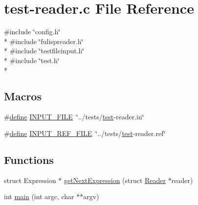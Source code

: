 \hypertarget{test-reader_8c}{\section{test-\/reader.c File Reference}
\label{test-reader_8c}
}
{\ttfamily \#include \char`\"{}config.\+h\char`\"{}}\\*
{\ttfamily \#include \char`\"{}fulispreader.\+h\char`\"{}}\\*
{\ttfamily \#include \char`\"{}testfileinput.\+h\char`\"{}}\\*
{\ttfamily \#include \char`\"{}test.\+h\char`\"{}}\\*
\subsection*{Macros}
\begin{DoxyCompactItemize}
\item 
\#\hyperlink{nativefunctions_8h_a06f28a72fd48e4a07d1d9e541bad304a}{define} \hyperlink{test-reader_8c_a2a3ad4ebb43e29f804a1e524aca840b2}{I\+N\+P\+U\+T\+\_\+\+F\+I\+L\+E}~\char`\"{}../tests/\hyperlink{test_8h_a3579ec9342b5c608ec759101a87e75cf}{test}-\/reader.\+in\char`\"{}
\item 
\#\hyperlink{nativefunctions_8h_a06f28a72fd48e4a07d1d9e541bad304a}{define} \hyperlink{test-reader_8c_a43e9fc259556970183f22f223a403250}{I\+N\+P\+U\+T\+\_\+\+R\+E\+F\+\_\+\+F\+I\+L\+E}~\char`\"{}../tests/\hyperlink{test_8h_a3579ec9342b5c608ec759101a87e75cf}{test}-\/reader.\+ref\char`\"{}
\end{DoxyCompactItemize}
\subsection*{Functions}
\begin{DoxyCompactItemize}
\item 
struct Expression $\ast$ \hyperlink{test-reader_8c_adb80091f1882165ba4fa18f719261cd5}{get\+Next\+Expression} (struct \hyperlink{structReader}{Reader} $\ast$reader)
\item 
int \hyperlink{test-reader_8c_a3c04138a5bfe5d72780bb7e82a18e627}{main} (int argc, char $\ast$$\ast$argv)
\end{DoxyCompactItemize}


